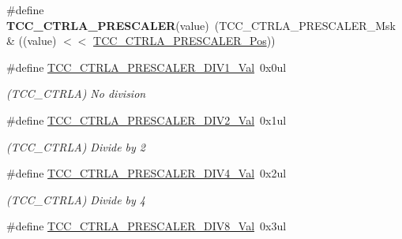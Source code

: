 \begin{DoxyCompactItemize}
\item 
\hypertarget{group___s_a_m_l21___t_c_c_ga05eb3bd5a85b9b2d9c91b2226ba94963}{}\#define {\bfseries T\+C\+C\+\_\+\+C\+T\+R\+L\+A\+\_\+\+P\+R\+E\+S\+C\+A\+L\+E\+R}(value)~(T\+C\+C\+\_\+\+C\+T\+R\+L\+A\+\_\+\+P\+R\+E\+S\+C\+A\+L\+E\+R\+\_\+\+Msk \& ((value) $<$$<$ \hyperlink{group___s_a_m_l21___t_c_c_ga32250640d272bee4d7ef7ef16fd8d97d}{T\+C\+C\+\_\+\+C\+T\+R\+L\+A\+\_\+\+P\+R\+E\+S\+C\+A\+L\+E\+R\+\_\+\+Pos}))\label{group___s_a_m_l21___t_c_c_ga05eb3bd5a85b9b2d9c91b2226ba94963}

\item 
\hypertarget{group___s_a_m_l21___t_c_c_gadd276c0ff8b221d35f6a2c235a6e8df3}{}\#define \hyperlink{group___s_a_m_l21___t_c_c_gadd276c0ff8b221d35f6a2c235a6e8df3}{T\+C\+C\+\_\+\+C\+T\+R\+L\+A\+\_\+\+P\+R\+E\+S\+C\+A\+L\+E\+R\+\_\+\+D\+I\+V1\+\_\+\+Val}~0x0ul\label{group___s_a_m_l21___t_c_c_gadd276c0ff8b221d35f6a2c235a6e8df3}

\begin{DoxyCompactList}\small\item\em (T\+C\+C\+\_\+\+C\+T\+R\+L\+A) No division \end{DoxyCompactList}\item 
\hypertarget{group___s_a_m_l21___t_c_c_ga74ebf13d5435775ec5c6d54959e19462}{}\#define \hyperlink{group___s_a_m_l21___t_c_c_ga74ebf13d5435775ec5c6d54959e19462}{T\+C\+C\+\_\+\+C\+T\+R\+L\+A\+\_\+\+P\+R\+E\+S\+C\+A\+L\+E\+R\+\_\+\+D\+I\+V2\+\_\+\+Val}~0x1ul\label{group___s_a_m_l21___t_c_c_ga74ebf13d5435775ec5c6d54959e19462}

\begin{DoxyCompactList}\small\item\em (T\+C\+C\+\_\+\+C\+T\+R\+L\+A) Divide by 2 \end{DoxyCompactList}\item 
\hypertarget{group___s_a_m_l21___t_c_c_ga6c66d0a745eefa138dbfc42123c8c8c6}{}\#define \hyperlink{group___s_a_m_l21___t_c_c_ga6c66d0a745eefa138dbfc42123c8c8c6}{T\+C\+C\+\_\+\+C\+T\+R\+L\+A\+\_\+\+P\+R\+E\+S\+C\+A\+L\+E\+R\+\_\+\+D\+I\+V4\+\_\+\+Val}~0x2ul\label{group___s_a_m_l21___t_c_c_ga6c66d0a745eefa138dbfc42123c8c8c6}

\begin{DoxyCompactList}\small\item\em (T\+C\+C\+\_\+\+C\+T\+R\+L\+A) Divide by 4 \end{DoxyCompactList}\item 
\hypertarget{group___s_a_m_l21___t_c_c_ga43505437cfab38c083db27c1a96508e1}{}\#define \hyperlink{group___s_a_m_l21___t_c_c_ga43505437cfab38c083db27c1a96508e1}{T\+C\+C\+\_\+\+C\+T\+R\+L\+A\+\_\+\+P\+R\+E\+S\+C\+A\+L\+E\+R\+\_\+\+D\+I\+V8\+\_\+\+Val}~0x3ul\label{group___s_a_m_l21___t_c_c_ga43505437cfab38c083db27c1a96508e1}


\end{DoxyCompactItemize}
